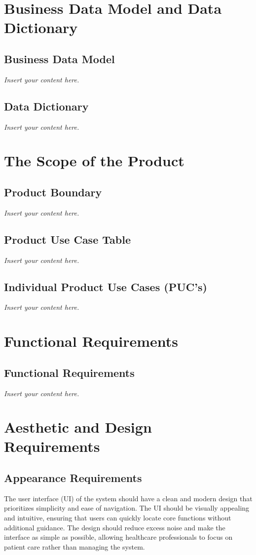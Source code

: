 \documentclass[12pt]{article}
\newcommand{\lips}{\textit{Insert your content here.}}
\begin{document}
\section{Business Data Model and Data Dictionary}
\subsection{Business Data Model}
\lips
\subsection{Data Dictionary}
\lips

\section{The Scope of the Product}
\subsection{Product Boundary}
\lips
\subsection{Product Use Case Table}
\lips
\subsection{Individual Product Use Cases (PUC's)}
\lips

\section{Functional Requirements}
\subsection{Functional Requirements}
\lips

\section{Aesthetic and Design Requirements}
\subsection{Appearance Requirements}
The user interface (UI) of the system should have a clean and modern design that prioritizes simplicity and ease of navigation. The UI should be visually appealing and intuitive, ensuring that users can quickly locate core functions without additional guidance. The design should reduce excess noise and make the interface as simple as possible, allowing healthcare professionals to focus on patient care rather than managing the system.
\end{document}
